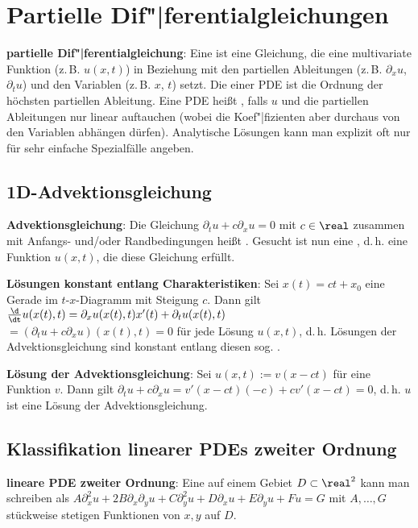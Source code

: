 \section{%
    Partielle Dif"|ferentialgleichungen%
}

\textbf{partielle Dif"|ferentialgleichung}:
Eine  ist eine Gleichung,
die eine multivariate Funktion (z.\,B. $u(x, t)$) in Beziehung mit den partiellen Ableitungen
(z.\,B. $\partial_x u$, $\partial_t u$) und den Variablen (z.\,B. $x$, $t$) setzt.
Die  einer PDE ist die Ordnung der höchsten partiellen Ableitung.
Eine PDE heißt , falls $u$ und die partiellen Ableitungen nur linear auftauchen
(wobei die Koef"|fizienten aber durchaus von den Variablen abhängen dürfen).
Analytische Lösungen kann man explizit oft nur für sehr einfache Spezialfälle angeben.

\subsection{%
    1D-Advektionsgleichung%
}

\textbf{Advektionsgleichung}:
Die Gleichung $\partial_t u + c \partial_x u = 0$ mit $c \in \real$ zusammen mit
Anfangs- und/oder Randbedingungen heißt .
Gesucht ist nun eine , d.\,h. eine Funktion $u(x, t)$,
die diese Gleichung erfüllt.

\textbf{Lösungen konstant entlang Charakteristiken}:
Sei $x(t) = ct + x_0$ eine Gerade im $t$-$x$-Diagramm mit Steigung $c$.
Dann gilt $\frac{\d}{\dt} u(x(t), t) = \partial_x u(x(t), t) x'(t) + \partial_t u(x(t), t)$\\
$= (\partial_t u + c \partial_x u)(x(t), t) = 0$ für jede Lösung $u(x, t)$,
d.\,h. Lösungen der Advektionsgleichung sind konstant entlang diesen sog.
.

\textbf{Lösung der Advektionsgleichung}:
Sei $u(x, t) := v(x - ct)$ für eine Funktion $v$.
Dann gilt $\partial_t u + c \partial_x u = v'(x - ct) (-c) + c v'(x - ct) = 0$,
d.\,h. $u$ ist eine Lösung der Advektionsgleichung.

\subsection{%
    Klassifikation linearer PDEs zweiter Ordnung%
}

\textbf{lineare PDE zweiter Ordnung}:
Eine  auf einem Gebiet $D \subset \real^2$ kann man schreiben
als $A \partial_x^2 u + 2B \partial_x \partial_y u + C \partial_y^2 u +
D \partial_x u + E \partial_y u + Fu = G$ mit $A, \dotsc, G$ stückweise stetigen Funktionen
von $x, y$ auf $D$.

